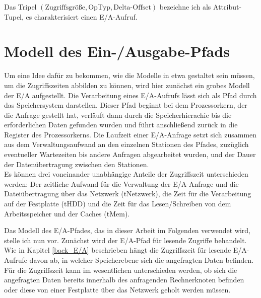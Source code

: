 \documentclass[
	12pt,
	a4paper,
	BCOR10mm,
	DIV14,
	listof=totoc,
	bibliography=totoc,
	headsepline
]{scrreprt}
\begin{document}
Das Tripel $(\mbox{Zugriffsgröße},\mbox{OpTyp},\mbox{Delta-Offset})$ bezeichne ich als Attribut-Tupel, es charakterisiert einen E/A-Aufruf.

\section{Modell des Ein-/Ausgabe-Pfads}
\label{analyse:ea_modell}
Um eine Idee dafür zu bekommen, wie die Modelle in etwa gestaltet sein müssen, um die Zugriffszeiten abbilden zu können, wird hier zunächst ein grobes Modell der E/A aufgestellt.
Die Verarbeitung eines E/A-Aufrufs lässt sich als Pfad durch das Speichersystem darstellen.
Dieser Pfad beginnt bei dem Prozessorkern, der die Anfrage gestellt hat, verläuft dann durch die Speicherhierachie bis die erforderlichen Daten gefunden wurden und führt anschließend zurück in die Register des Prozessorkerns.
Die Laufzeit einer E/A-Anfrage setzt sich zusammen aus dem Verwaltungsaufwand an den einzelnen Stationen des Pfades, zuzüglich eventueller Wartezeiten bis andere Anfragen abgearbeitet wurden, und der Dauer der Datenübertragung zwischen den Stationen.\\
Es können drei voneinander unabhängige Anteile der Zugriffszeit unterschieden werden:
Der zeitliche Aufwand für die Verwaltung der E/A-Anfrage und die Dateiübertragung über das Netzwerk (tNetzwerk), die Zeit für die Verarbeitung auf der Festplatte (tHDD) und die Zeit für das Lesen/Schreiben von dem Arbeitsspeicher und der Caches (tMem).\medskip

Das Modell des E/A-Pfades, das in dieser Arbeit im Folgenden verwendet wird, stelle ich nun vor. Zunächst wird der E/A-Pfad für lesende Zugriffe behandelt.
Wie in Kapitel \ref{back_E/A} beschrieben hängt die Zugriffszeit für lesende E/A-Aufrufe davon ab, in welcher Speicherebene sich die angefragten Daten befinden.
Für die Zugriffszeit kann im wesentlichen unterschieden werden, ob sich die angefragten Daten bereits innerhalb des anfragenden Rechnerknoten befinden oder diese von einer Festplatte über das Netzwerk geholt werden müssen.
\end{document}
